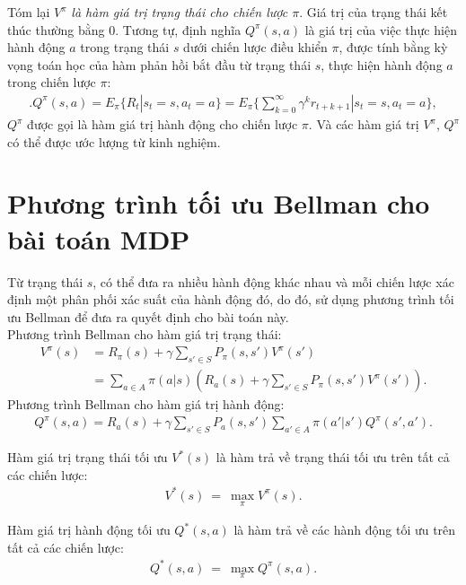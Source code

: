 Tóm lại $V^\pi$ \textit{là hàm giá trị trạng thái cho chiến lược $\pi$}. Giá trị của trạng thái kết thúc thường bằng $0$. Tương tự, định nghĩa $Q^\pi(s,a)$ là giá trị của việc thực hiện hành động $a$ trong trạng thái $s$ dưới chiến lược điều khiển $\pi$, được tính bằng kỳ vọng toán học của hàm phản hồi bắt đầu từ trạng thái $s$, thực hiện hành động $a$ trong chiến lược $\pi$:
\begin{align*}
.Q^\pi(s,a)=E_\pi \lbrace R_t|s_t=s,a_t=a\rbrace =E_\pi \Big\lbrace \sum_{k=0}^{\infty}\gamma^k r_{t+k+1}|s_t=s,a_t=a \Big \rbrace,
\end{align*}
$Q^\pi$ được gọi là hàm giá trị hành động cho chiến lược $\pi$. Và các hàm giá trị $V^\pi$, $Q^\pi$ có thể được ước lượng từ kinh nghiệm.
\section{Phương trình tối ưu Bellman cho bài toán MDP}

Từ trạng thái $s$, có thể đưa ra nhiều hành động khác nhau và mỗi chiến lược xác định một phân phối xác suất của hành động đó, do đó, sử dụng phương trình tối ưu Bellman để đưa ra quyết định cho bài toán này.\\
Phương trình Bellman cho hàm giá trị trạng thái:
\begin{align*}
V^{\pi}(s)&=R_{\pi}(s)+\gamma \sum_{s'\in S}P_{\pi}(s,s')V^{\pi}(s')\\
&=\sum_{a\in A}\pi(a|s)\left ( R_{a}(s)+\gamma \sum_{s'\in S}P_{\pi}(s,s')V^{\pi}(s') \right ).
\end{align*}
Phương trình Bellman cho hàm giá trị hành động:
\begin{align*}
Q^{\pi}(s,a)=R_{a}(s)+\gamma \sum_{s'\in S} P_{a}(s,s')\sum_{a' \in A}\pi(a'|s')Q^{\pi}(s',a').
\end{align*}
\begin{dn} \rm
Hàm giá trị trạng thái tối ưu $V^{*}(s)$ là hàm trả về trạng thái tối ưu trên tất cả các chiến lược:
\begin{align*}
V^{*}(s)~=~\displaystyle\max_{\pi} V^{\pi}(s).
\end{align*}
\end{dn}
\begin{dn} \rm
Hàm giá trị hành động tối ưu $Q^{*}(s,a)$ là hàm trả về các hành động tối ưu trên tất cả các chiến lược:
\begin{align*}
Q^{*}(s,a)~=~\displaystyle\max_{\pi} Q^{\pi}(s,a).
\end{align*}
\end{dn}

